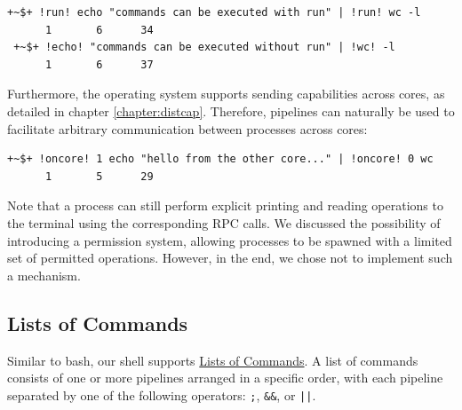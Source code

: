 \begin{lstlisting}[style=ShellInputStyle, deletekeywords={run, command, wc, echo}, caption={Pipelines with or without the \texttt{run}/\texttt{oncore} Directives}, label={listing:shell_pipeline_omit}]
 +~$+ !run! echo "commands can be executed with run" | !run! wc -l
      1       6      34
 +~$+ !echo! "commands can be executed without run" | !wc! -l
      1       6      37
\end{lstlisting}

Furthermore, the operating system supports sending capabilities across cores, as detailed in chapter \ref{chapter:distcap}. Therefore, pipelines can naturally be used to facilitate arbitrary communication between processes across cores:

\begin{lstlisting}[style=ShellInputStyle, deletekeywords={run, command, wc, echo}]
 +~$+ !oncore! 1 echo "hello from the other core..." | !oncore! 0 wc
      1       5      29
\end{lstlisting}


 Note that a process can still perform explicit printing and reading operations to the terminal using the corresponding RPC calls. We discussed the possibility of introducing a permission system, allowing processes to be spawned with a limited set of permitted operations. However, in the end, we chose not to implement such a mechanism.

\subsection{Lists of Commands}

Similar to bash, our shell supports \href{https://www.gnu.org/software/bash/manual/html_node/Lists.html}{Lists of Commands}. A list of commands consists of one or more pipelines arranged in a specific order, with each pipeline separated by one of the following operators: \texttt{;}, \texttt{\&\&}, or \texttt{||}. 


